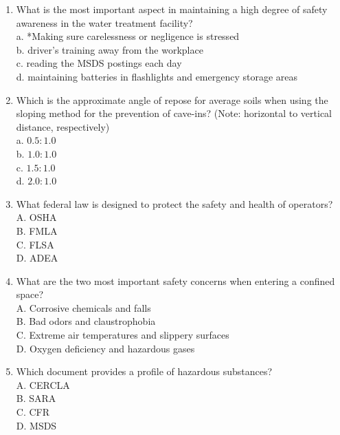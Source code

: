 
\begin{enumerate}[1.]










  \item What is the most important aspect in maintaining a high degree of safety awareness in the water treatment facility?\\
a. *Making sure carelessness or negligence is stressed\\
b. driver's training away from the workplace\\
c. reading the MSDS postings each day\\
d. maintaining batteries in flashlights and emergency storage areas 

  \item Which is the approximate angle of repose for average soils when using the sloping method for the prevention of cave-ins? (Note: horizontal to vertical distance, respectively)\\
a. $0.5: 1.0$\\
b. $1.0: 1.0$\\
c. $1.5: 1.0$\\
d. $2.0: 1.0$


\item What federal law is designed to protect the safety and health of operators?\\
A.	OSHA\\
B.	FMLA\\
C.	FLSA\\
D.	ADEA

\item What are the two most important safety concerns when entering a confined space?\\
A.	Corrosive chemicals and falls\\
B.	Bad odors and claustrophobia\\
C.	Extreme air temperatures and slippery surfaces\\
D.	Oxygen deficiency and hazardous gases

\item Which document provides a profile of hazardous substances?\\
A.	CERCLA\\
B.	SARA\\
C.	CFR\\
D.	MSDS


\end{enumerate}

